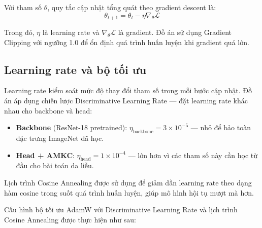 Với tham số $\theta$, quy tắc cập nhật tổng quát theo gradient descent là:
\begin{equation}
  \theta_{t+1}=\theta_t-\eta\nabla_\theta\mathcal{L}
\end{equation}

Trong đó, $\eta$ là learning rate và $\nabla_\theta\mathcal{L}$ là gradient. Đồ án sử dụng Gradient Clipping với ngưỡng 1.0 để ổn định quá trình huấn luyện khi gradient quá lớn.

\subsection{Learning rate và bộ tối ưu}

Learning rate kiểm soát mức độ thay đổi tham số trong mỗi bước cập nhật. Đồ án áp dụng chiến lược Discriminative Learning Rate --- đặt learning rate khác nhau cho backbone và head:
\begin{itemize}
  \item \textbf{Backbone} (ResNet-18 pretrained): $\eta_{\text{backbone}}=3\times10^{-5}$ --- nhỏ để bảo toàn đặc trưng ImageNet đã học.
  \item \textbf{Head + AMKC}: $\eta_{\text{head}}=1\times10^{-4}$ --- lớn hơn vì các tham số này cần học từ đầu cho bài toán da liễu.
\end{itemize}

Lịch trình Cosine Annealing được sử dụng để giảm dần learning rate theo dạng hàm cosine trong suốt quá trình huấn luyện, giúp mô hình hội tụ mượt mà hơn.

Cấu hình bộ tối ưu AdamW với Discriminative Learning Rate và lịch trình Cosine Annealing được thực hiện như sau:

